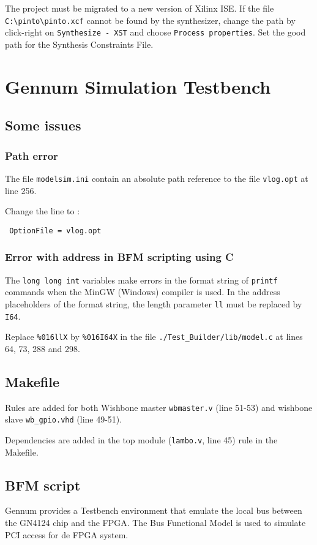 \documentclass[10pt,a4paper]{cerndoc}
\begin{document}
The project must be migrated to a new version of Xilinx ISE.
If the file \verb+C:\pinto\pinto.xcf+ cannot be found by the synthesizer, change the path by click-right on \verb+Synthesize - XST+ and choose \verb+Process properties+. Set the good path for the Synthesis Constraints File.
  

\section{Gennum Simulation Testbench}
  \subsection{Some issues}
    \subsubsection{Path error}
The file \verb+modelsim.ini+ contain an absolute path reference to the file \verb+vlog.opt+ at line 256.

Change the line to :
\begin{lstlisting}
 OptionFile = vlog.opt
\end{lstlisting}
	
    \subsubsection{Error with address in BFM scripting using C}
The \verb+long long int+ variables make errors in the format string of \verb+printf+ commands when the MinGW (Windows) compiler is used. 
In the address placeholders of the format string, the length parameter \verb+ll+ must be replaced by \verb+I64+.

Replace \verb+%016llX+
by \verb+%016I64X+ 
in the file \verb+./Test_Builder/lib/model.c+ at lines 64, 73, 288 and 298.

  \subsection{Makefile}
Rules are added for both Wishbone master \verb+wbmaster.v+ (line 51-53) and wishbone slave \verb+wb_gpio.vhd+ (line 49-51).

Dependencies are added in the top module (\verb+lambo.v+, line 45) rule in the Makefile.
	
	
  \subsection{BFM script}
Gennum provides a Testbench environment that emulate the local bus between the GN4124 chip and the FPGA. The Bus Functional Model is used to simulate PCI access for de FPGA system.
	
\end{document}
